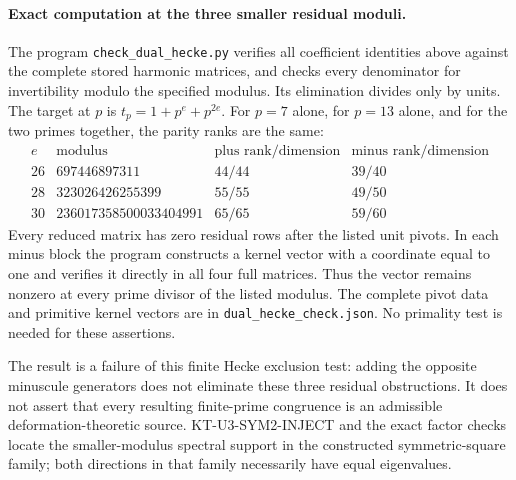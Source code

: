 \paragraph{Exact computation at the three smaller residual moduli.}
The program \texttt{check\_dual\_hecke.py} verifies all coefficient
identities above against the complete stored harmonic matrices,
and checks every denominator for invertibility modulo the
specified modulus.  Its elimination divides only by units.
The target at $p$ is $t_p=1+p^e+p^{2e}$.
For $p=7$ alone, for $p=13$ alone, and for the two primes
together, the parity ranks are the same:
\[
\begin{array}{c|r|c|c}
e&\text{modulus}&\text{plus rank/dimension}&
                         \text{minus rank/dimension}\\\hline
26&697446897311&44/44&39/40\\
28&323026426255399&55/55&49/50\\
30&236017358500033404991&65/65&59/60
\end{array}
\]
Every reduced matrix has zero residual rows after the listed
unit pivots.  In each minus block the program constructs a
kernel vector with a coordinate equal to one and verifies it
directly in all four full matrices.  Thus the vector remains
nonzero at every prime divisor of the listed modulus.
The complete pivot data and primitive kernel vectors are in
\texttt{dual\_hecke\_check.json}.  No primality test is needed
for these assertions.

The result is a failure of this finite Hecke exclusion test:
adding the opposite minuscule generators does not eliminate
these three residual obstructions.  It does not assert that
every resulting finite-prime congruence is an admissible
deformation-theoretic source.  KT-U3-SYM2-INJECT and the exact
factor checks locate the smaller-modulus spectral support in
the constructed symmetric-square family; both directions in
that family necessarily have equal eigenvalues.
